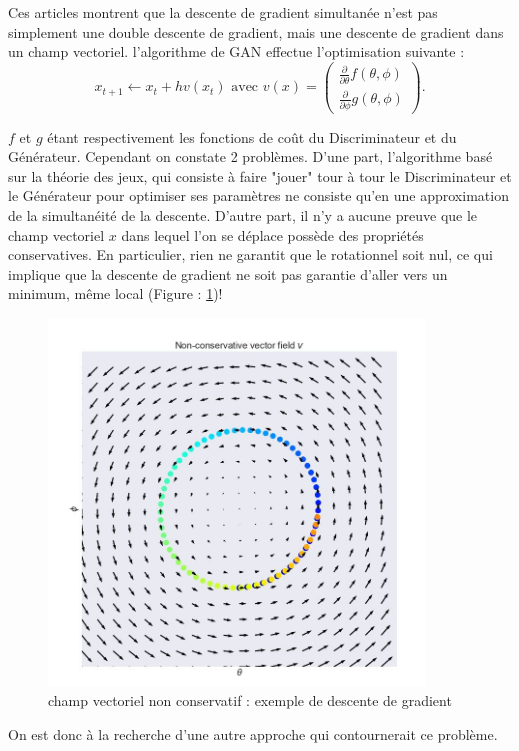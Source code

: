 Ces articles montrent que la descente de gradient simultanée n'est pas simplement une double descente de gradient, mais une descente de gradient dans un champ vectoriel. l'algorithme de GAN effectue l'optimisation suivante : 
\[x_{t+1} \leftarrow x_t + h v(x_t) \text{ avec } v(x) = \left(\begin{matrix}\frac{\partial}{\partial\theta}f(\theta, \phi)\\\frac{\partial}{\partial\phi}g(\theta, \phi)\end{matrix}\right).\]

$f$ et $g$ étant respectivement les fonctions de coût du Discriminateur et du Générateur. Cependant on constate 2 problèmes. D'une part, l'algorithme basé sur la théorie des jeux, qui consiste à faire "jouer" tour à tour le Discriminateur et le Générateur pour optimiser ses paramètres ne consiste qu'en une approximation de la simultanéité de la descente. D'autre part, il n'y a aucune preuve que le champ vectoriel $x$ dans lequel l'on se déplace possède des propriétés conservatives. En particulier, rien ne garantit que le rotationnel soit nul, ce qui implique que la descente de gradient ne soit pas garantie d'aller vers un minimum, même local (Figure : \ref{fig:vector_field})!

\begin{figure}[ht!]
  \centering
    \includegraphics[width=10cm]{fig/vector_field}
    \caption{champ vectoriel non conservatif : exemple de descente de gradient}
    \label{fig:vector_field}
\end{figure}

On est donc à la recherche d'une autre approche qui contournerait ce problème.




